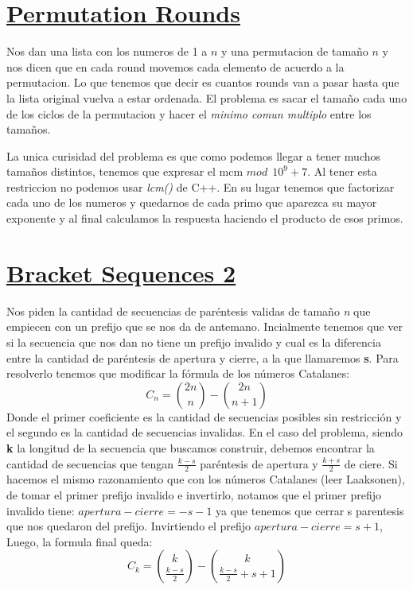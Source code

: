\documentclass{article}
\begin{document}
\section{\href{https://cses.fi/problemset/task/3398}{Permutation Rounds}}
Nos dan una lista con los numeros de 1 a $n$ y una permutacion de tamaño $n$ y nos dicen que en cada round movemos cada elemento de acuerdo a la permutacion. Lo que tenemos que decir es cuantos rounds van a pasar hasta que la lista original vuelva a estar ordenada. El problema es sacar el tamaño cada uno de los ciclos de la permutacion y hacer el \textit{minimo comun multiplo} entre los tamaños. 

La unica curisidad del problema es que como podemos llegar a tener muchos tamaños distintos, tenemos que expresar el mcm $mod \: \: 10^9 + 7$. Al tener esta restriccion no podemos usar \textit{lcm()} de C++. En su lugar tenemos que factorizar cada uno de los numeros y quedarnos de cada primo que aparezca su mayor exponente y al final calculamos la respuesta haciendo el producto de esos primos.

\section{\href{https://cses.fi/problemset/task/2187}{Bracket Sequences 2}}
Nos piden la cantidad de secuencias de paréntesis validas de tamaño \textit{n} que empiecen con un prefijo que se nos da de antemano. Incialmente tenemos que ver si la secuencia que nos dan no tiene un prefijo invalido y cual es la diferencia entre la cantidad de paréntesis de apertura y cierre, a la que llamaremos \textbf{s}. Para resolverlo tenemos que modificar la fórmula de los números Catalanes:
\[C_n = \binom{2n}{n} - \binom{2n}{n + 1}\]
Donde el primer coeficiente es la cantidad de secuencias posibles sin restricción y el segundo es la cantidad de secuencias invalidas.
En el caso del problema, siendo \textbf{k} la longitud de la secuencia que buscamos construir, debemos encontrar la cantidad de secuencias que tengan $\frac{k - s}{2}$ paréntesis de apertura y $\frac{k + s}{2}$ de ciere. Si hacemos el mismo razonamiento que con los números Catalanes (leer Laaksonen), de tomar el primer prefijo invalido e invertirlo, notamos que el primer prefijo invalido tiene: $apertura - cierre = -s - 1$ ya que tenemos que cerrar s parentesis que nos quedaron del prefijo. Invirtiendo el prefijo $apertura - cierre = s + 1$, Luego, la formula final queda:
\[C_k = \binom{k}{\frac{k - s}{2}} - \binom{k}{\frac{k - s}{2} + s + 1}\]
\end{document}

